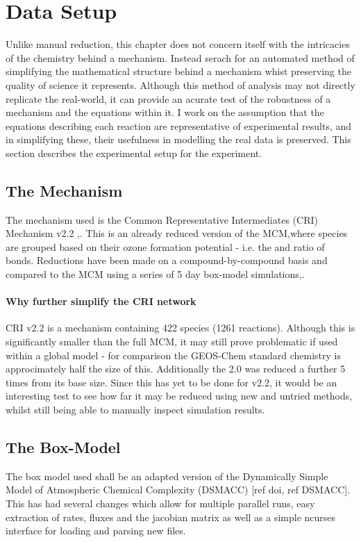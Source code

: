 \section{Data Setup}
Unlike manual reduction, this chapter does not concern itself with the intricacies of the chemistry behind a mechanism. Instead serach for an automated method of simplifying the mathematical structure behind a mechanism whist preserving the quality of science it represents. Although this method of analysis may not directly replicate the real-world, it can provide an acurate test of the robustness of a mechanism and the equations within it. I work on the assumption that the equations describing each reaction are representative of experimental results, and in simplifying these, their usefulness in modelling the real data is preserved. This section describes the experimental setup for the experiment.


\subsection{The Mechanism}
The mechanism used is the Common Representative Intermediates (CRI) Mechanism v2.2 ,\cite{criv2}. This is an already reduced version of the MCM,where species are grouped based on their ozone formation potential - i.e. the  and  ratio of bonds. 
Reductions have been made on a compound-by-compound basis and compared to the MCM using a series of 5 day box-model simulations,\cite{cri}. 

\paragraph*{Why further simplify the CRI network}

CRI v2.2 is a mechanism containing 422 species (1261 reactions). Although this is significantly smaller than the full MCM, it may still prove problematic if used within a global model - for comparison the GEOS-Chem standard chemistry is approcimately half the size of this. Additionally the 2.0 was reduced a further 5 times from its base size. Since this has yet to be done for v2.2, it would be an interesting test to see how far it may be reduced using new and untried methods, whilst still being able to manually inspect simulation results.

\subsection{The Box-Model}
The box model used shall be an adapted version of the Dynamically Simple Model of Atmospheric Chemical Complexity (DSMACC) [ref doi, ref DSMACC]. This has had several changes which allow for multiple parallel runs, easy extraction of rates, fluxes and the jacobian matrix as well as a simple ncurses interface for loading and parsing new files. \\

